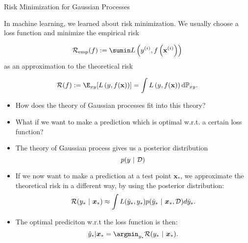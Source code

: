 \documentclass[11pt,compress,t,notes=noshow, xcolor=table]{beamer}
\begin{document}
\begin{vbframe}{Risk Minimization for Gaussian Processes}

In machine learning, we learned about risk minimization. We usually choose a loss function and minimize the empirical risk  

$$
  \riske(f) := \sumin \Lxyi
$$
as an approximation to the theoretical risk

$$ 
  \riskf := \E_{xy} [\Lxy] = \int \Lxy \text{d}\Pxy. 
$$

\begin{itemize}
  \item How does the theory of Gaussian processes fit into this theory? 
  \item What if we want to make a prediction which is optimal w.r.t. a certain loss function? 
\end{itemize}

\framebreak 

\begin{itemize}
  \item The theory of Gaussian process gives us a posterior distribution 
  $$
    p(y ~|~\mathcal{D})
  $$
  \item If we now want to make a prediction at a test point $\bm{x}_*$, we approximate the theoretical risk in a different way, by using the posterior distribution: 
  $$
    \mathcal{R}(y_* ~|~ \bm{x}_*) \approx \int L(\tilde y_*, y_*) p(\tilde y_*~|~\bm{x}_*, \mathcal{D})d\tilde y_*. 
  $$
  \item The optimal prediciton w.r.t the loss function is then: 
  $$
    \hat y_* | \bm{x}_* = \argmin_{y_*} \mathcal{R}(y_*~|~ \bm{x}_*).
  $$
\end{itemize}









\end{vbframe}
\end{document}
